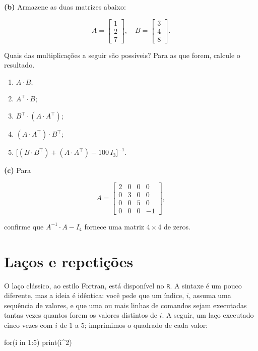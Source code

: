 \documentclass[
  letterpaper,
  DIV=11,
  numbers=noendperiod]{scrreprt}
\newenvironment{Shaded}{\begin{snugshade}}{\end{snugshade}}
\newcommand{\ControlFlowTok}[1]{\textcolor[rgb]{0.00,0.23,0.31}{#1}}
\newcommand{\DecValTok}[1]{\textcolor[rgb]{0.68,0.00,0.00}{#1}}
\newcommand{\FunctionTok}[1]{\textcolor[rgb]{0.28,0.35,0.67}{#1}}
\newcommand{\NormalTok}[1]{\textcolor[rgb]{0.00,0.23,0.31}{#1}}
\newcommand{\SpecialCharTok}[1]{\textcolor[rgb]{0.37,0.37,0.37}{#1}}
\begin{document}
\textbf{(b)} Armazene as duas matrizes abaixo:

\[
A=\begin{bmatrix}1\\2\\7\end{bmatrix},
\quad
B=\begin{bmatrix}3\\4\\8\end{bmatrix}.
\]

Quais das multiplicações a seguir são possíveis? Para as que forem,
calcule o resultado.

\begin{enumerate}
\def\labelenumi{\roman{enumi}.}
\item
  \(A \cdot B\);
\item
  \(A^{\top} \cdot B\);
\item
  \(B^{\top} \cdot (A \cdot A^{\top})\);
\item
  \((A \cdot A^{\top}) \cdot B^{\top}\);
\item
  \(\big[(B \cdot B^{\top}) + (A \cdot A^{\top}) - 100\,I_{3}\big]^{-1}\).
\end{enumerate}

\textbf{(c)} Para

\[
A = \begin{bmatrix}
2&0&0&0\\
0&3&0&0\\
0&0&5&0\\
0&0&0&-1
\end{bmatrix},
\]

confirme que \(A^{-1}\cdot A - I_{4}\) fornece uma matriz \(4\times 4\)
de zeros.

\section{Laços e repetições}\label{lauxe7os-e-repetiuxe7uxf5es}

O laço clássico, ao estilo Fortran, está disponível no \texttt{R}. A
sintaxe é um pouco diferente, mas a ideia é idêntica: você pede que um
índice, \(i\), assuma uma sequência de valores, e que uma ou mais linhas
de comandos sejam executadas tantas vezes quantos forem os valores
distintos de \(i\). A seguir, um laço executado cinco vezes com \(i\) de
\(1\) a \(5\); imprimimos o quadrado de cada valor:

\begin{Shaded}
\begin{Highlighting}[]
\ControlFlowTok{for}\NormalTok{(i }\ControlFlowTok{in} \DecValTok{1}\SpecialCharTok{:}\DecValTok{5}\NormalTok{) }\FunctionTok{print}\NormalTok{(i}\SpecialCharTok{\^{}}\DecValTok{2}\NormalTok{)}
\end{Highlighting}
\end{Shaded}
\end{document}
